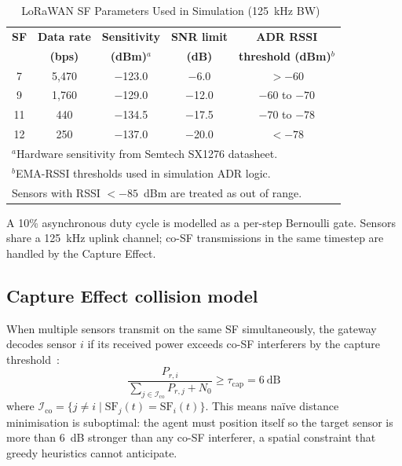 \documentclass[conference]{IEEEtran}
\begin{document}
\begin{table}[htbp]
\caption{LoRaWAN SF Parameters Used in Simulation (125~kHz BW)~\cite{semtech2020sx1276,croce2020lora}}
\begin{center}
\setlength{\tabcolsep}{4pt}
\renewcommand{\arraystretch}{1.1}
\begin{tabular}{|c|c|c|c|c|}
\hline
\textbf{SF} & \textbf{Data rate} & \textbf{Sensitivity} & \textbf{SNR limit} & \textbf{ADR RSSI} \\
            & \textbf{(bps)}     & \textbf{(dBm)}$^{a}$ & \textbf{(dB)}      & \textbf{threshold (dBm)}$^{b}$ \\
\hline
7  & 5{,}470 & $-$123.0 & $-$6.0  & $> -60$ \\
9  & 1{,}760 & $-$129.0 & $-$12.0 & $-60$ to $-70$ \\
11 &    440  & $-$134.5 & $-$17.5 & $-70$ to $-78$ \\
12 &    250  & $-$137.0 & $-$20.0 & $< -78$ \\
\hline
\multicolumn{5}{l}{\footnotesize $^{a}$Hardware sensitivity from Semtech SX1276 datasheet.} \\
\multicolumn{5}{l}{\footnotesize $^{b}$EMA-RSSI thresholds used in simulation ADR logic.} \\
\multicolumn{5}{l}{\footnotesize Sensors with RSSI $< -85$~dBm are treated as out of range.}
\end{tabular}
\label{tab:sf}
\end{center}
\end{table}

A 10\% asynchronous duty cycle is modelled as a per-step Bernoulli gate. Sensors share a 125~kHz uplink channel; co-SF transmissions in the same timestep are handled by the Capture Effect.

\subsection{Capture Effect collision model}

When multiple sensors transmit on the same SF simultaneously, the gateway decodes sensor $i$ if its received power exceeds co-SF interferers by the capture threshold~\cite{croce2020lora,reynders2016range}:
\begin{equation}
\frac{P_{r,i}}{\displaystyle\sum_{j \in \mathcal{I}_{\text{co}}} P_{r,j} + N_0} \geq \tau_{\text{cap}} = 6~\text{dB}
\label{eq:capture}
\end{equation}
where $\mathcal{I}_{\text{co}} = \{j \neq i \mid \text{SF}_j(t) = \text{SF}_i(t)\}$. This means na\"ive distance minimisation is suboptimal: the agent must position itself so the target sensor is more than 6~dB stronger than any co-SF interferer, a spatial constraint that greedy heuristics cannot anticipate.
\end{document}
